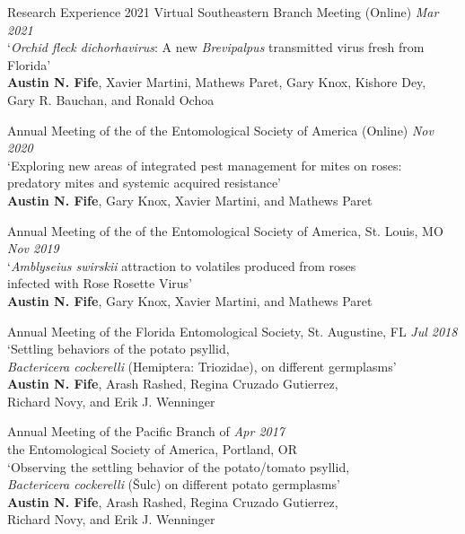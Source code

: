 \documentclass{resume} %
\begin{document}
\begin{rSection}{Research Experience}
2021 Virtual Southeastern Branch Meeting (Online) \hfill {\em \textit{Mar 2021}}\\
`\textit{Orchid fleck dichorhavirus}: A new \textit{Brevipalpus} transmitted virus fresh from Florida'\\
\textbf{Austin N. Fife}, Xavier Martini, Mathews Paret, Gary Knox, Kishore Dey,\\
Gary R. Bauchan, and Ronald Ochoa\\ \hfill

Annual Meeting of the of the Entomological Society of America (Online) \hfill {\em \textit{Nov 2020}}\\
`Exploring new areas of integrated pest management for mites on roses:\\
predatory mites and systemic acquired resistance'\\
\textbf{Austin N. Fife}, Gary Knox, Xavier Martini, and Mathews Paret\\ \hfill

Annual Meeting of the of the Entomological Society of America, St. Louis, MO \hfill {\em \textit{Nov 2019}}\\
`\textit{Amblyseius swirskii} attraction to volatiles produced from roses\\
infected with Rose Rosette Virus'\\
\textbf{Austin N. Fife}, Gary Knox, Xavier Martini, and Mathews Paret\\ \hfill

\newpage

Annual Meeting of the Florida Entomological Society, St. Augustine, FL \hfill {\em \textit{Jul 2018}}\\
`Settling behaviors of the potato psyllid, \\ \textit{Bactericera cockerelli} (Hemiptera: Triozidae), on different germplasms'\\
\textbf{Austin N. Fife}, Arash Rashed, Regina Cruzado Gutierrez,\\
Richard Novy, and Erik J. Wenninger\\ \hfill

Annual Meeting of the Pacific Branch of \hfill {\em \textit{Apr 2017}}\\
the Entomological Society of America, Portland, OR\\
`Observing the settling behavior of the potato/tomato psyllid,\\
\textit{Bactericera cockerelli} (Šulc) on different potato germplasms'\\
\textbf{Austin N. Fife}, Arash Rashed, Regina Cruzado Gutierrez,\\
Richard Novy, and Erik J. Wenninger\\


\end{rSection}
\end{document}
